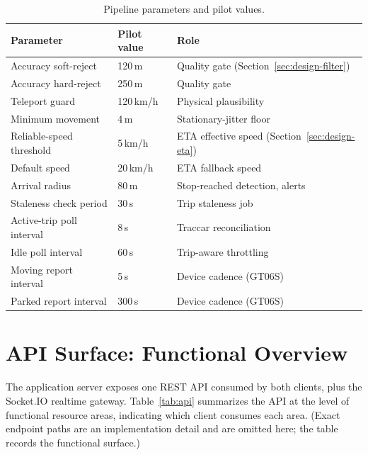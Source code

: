 \begin{table}[H]
\caption{Pipeline parameters and pilot values.}
\label{tab:params}
\centering
\small
\begin{tabular}{@{}lll@{}}
\toprule
\textbf{Parameter} & \textbf{Pilot value} & \textbf{Role} \\
\midrule
Accuracy soft-reject      & 120\,m      & Quality gate
(Section~\ref{sec:design-filter}) \\
Accuracy hard-reject      & 250\,m      & Quality gate \\
Teleport guard            & 120\,km/h   & Physical plausibility \\
Minimum movement          & 4\,m        & Stationary-jitter floor \\
Reliable-speed threshold  & 5\,km/h     & ETA effective speed
(Section~\ref{sec:design-eta}) \\
Default speed             & 20\,km/h    & ETA fallback speed \\
Arrival radius            & 80\,m       & Stop-reached detection, alerts \\
Staleness check period    & 30\,s       & Trip staleness job \\
Active-trip poll interval & 8\,s        & Traccar reconciliation \\
Idle poll interval        & 60\,s       & Trip-aware throttling \\
Moving report interval    & 5\,s        & Device cadence (GT06S) \\
Parked report interval    & 300\,s      & Device cadence (GT06S) \\
\bottomrule
\end{tabular}
\end{table}

\chapter{API Surface: Functional Overview}
\label{app:api}
The application server exposes one REST API consumed by both clients,
plus the Socket.IO realtime gateway. Table~\ref{tab:api} summarizes the
API at the level of functional resource areas, indicating which client
consumes each area. (Exact endpoint paths are an implementation detail
and are omitted here; the table records the functional surface.)

